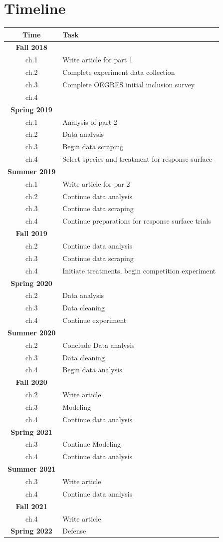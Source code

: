 \documentclass{article}\usepackage[]{graphicx}\usepackage[]{color}
\begin{document}
\section*{Timeline}
\begin{center}
\begin{tabular}{|c|l|}
\hline
Time & Task\\
\hline
\textbf{Fall 2018}& \\
ch.1 & Write article for part 1\\
ch.2 & Complete experiment data collection\\
ch.3 & Complete OEGRES initial inclusion survey\\
ch.4 &  \\
\hline
\textbf{Spring 2019}& \\
ch.1 & Analysis of part 2\\
ch.2 & Data analysis\\
ch.3 & Begin data scraping\\
ch.4 & Select species and treatment for response surface \\
\hline
\textbf{Summer 2019}& \\
ch.1 & Write article for par 2\\
ch.2 & Continue data analysis\\
ch.3 & Continue data scraping\\
ch.4 & Continue preparations for response surface trials \\
\hline
\textbf{Fall 2019}& \\
ch.2 & Continue data analysis\\
ch.3 & Continue data scraping\\
ch.4 & Initiate treatments, begin competition experiment \\
\hline
\textbf{Spring 2020}& \\
ch.2 & Data analysis\\
ch.3 & Data cleaning\\
ch.4 & Continue experiment\\
\hline
\textbf{Summer 2020}& \\
ch.2 & Conclude Data analysis\\
ch.3 & Data cleaning\\
ch.4 & Begin data analysis\\
\hline
\textbf{Fall 2020}& \\
ch.2 & Write article\\
ch.3 & Modeling\\
ch.4 & Continue data analysis\\
\hline
\textbf{Spring 2021}& \\
ch.3 & Continue Modeling\\
ch.4 & Continue data analysis\\
\hline
\textbf{Summer 2021}& \\
ch.3 & Write article\\
ch.4 & Continue data analysis\\
\hline
\textbf{Fall 2021}& \\
ch.4 & Write article\\
\hline
\textbf{Spring 2022}& Defense \\
\hline


\end{tabular}
\end{center}
\end{document}
